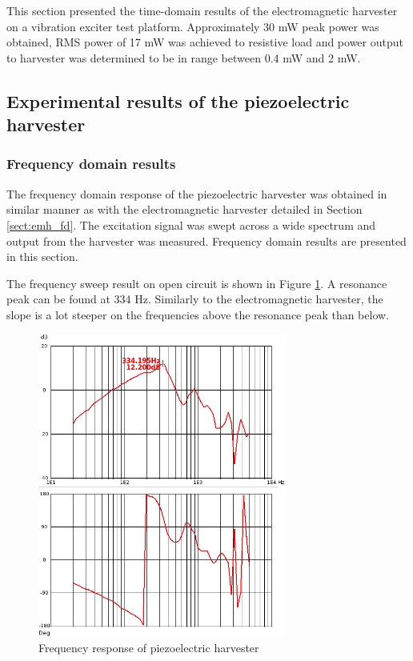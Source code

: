 This section presented the time-domain results of the electromagnetic harvester on a vibration exciter test platform. Approximately 30 mW peak power was obtained, RMS power of 17 mW was achieved to resistive load and power output to harvester was determined to be in range between 0.4 mW and 2 mW. 

\subsection{Experimental results of the piezoelectric harvester}
\subsubsection{Frequency domain results} \label{sect:piezo_fd}
The frequency domain response of the piezoelectric harvester was obtained in similar manner as with the electromagnetic harvester detailed in Section \ref{sect:emh_fd}. The excitation signal was swept across a wide spectrum and output from the harvester was measured. Frequency domain results are presented in this section.

The frequency sweep result on open circuit is shown in Figure \ref{fig:piezo_fd}. A resonance peak can be found at 334 Hz. Similarly to the electromagnetic harvester, the slope is a lot steeper on the frequencies above the resonance peak than below. 

\begin{figure}[htb]
\begin{center}
\includegraphics[height=10cm]{images/own_measurement/generator_shaker/piezo_fd_open_2_3.png}
\end{center}
\caption{\label{fig:piezo_fd} Frequency response of piezoelectric harvester}
\end{figure}


